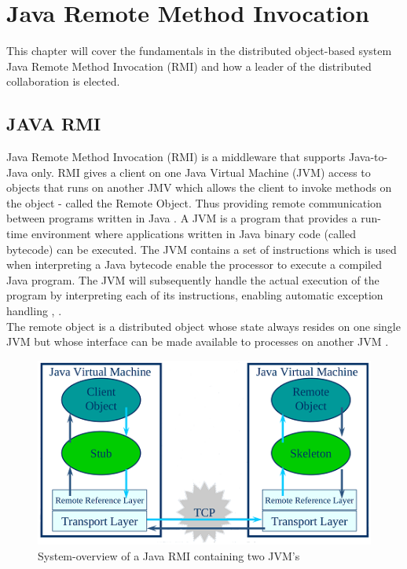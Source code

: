 \documentclass[Main]{subfiles}
\begin{document}
\chapter{Java Remote Method Invocation}
This chapter will cover the fundamentals in the distributed object-based system Java Remote Method Invocation (RMI) and how a leader of the distributed collaboration is elected.

\section{JAVA RMI}
Java Remote Method Invocation (RMI) is a middleware that supports Java-to-Java only. RMI gives a client on one Java Virtual Machine (JVM) access to objects that runs on another JMV which allows the client to invoke methods on the object - called the Remote Object. Thus providing remote communication between programs written in Java \cite{RMI-slides}. A JVM is a program that provides a run-time environment where applications written in Java binary code (called bytecode) can be executed. The JVM contains a set of instructions which is used when interpreting a Java bytecode enable the processor to execute a compiled Java program. The JVM will subsequently handle the actual execution of the program by interpreting each of its instructions, enabling automatic exception handling \cite[p. 422-423]{Tanenbaum}, \cite{wiki-jvm}.\\The remote object is a distributed object whose state always resides on one single JVM but whose interface can be made available to processes on another JVM \cite[p. 461]{Tanenbaum}.

\begin{figure}[H]
\centering
\includegraphics[scale=0.8]{Figurer/JVM.png}
\caption{System-overview of a Java RMI containing two JVM's \cite{RMI-slides}}
\label{Figure-jvm}
\end{figure}
\end{document}
